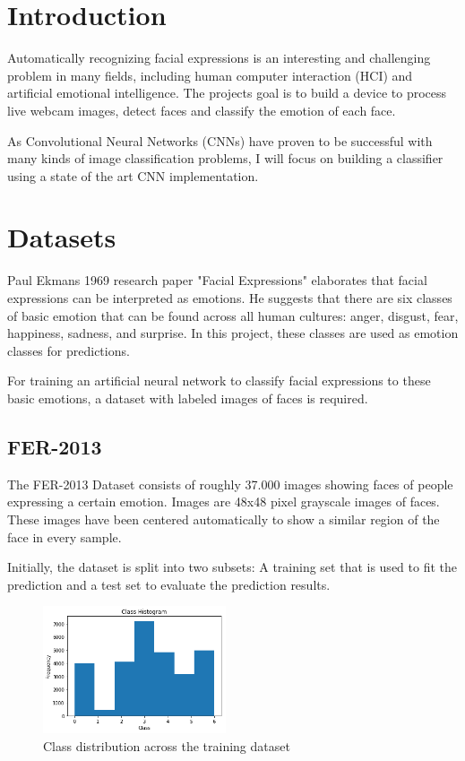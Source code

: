 \documentclass[twoside]{article}
\begin{document}
\begin{multicols}{2} %

\section{Introduction}

Automatically recognizing facial expressions is an interesting and challenging problem in many fields, including human computer interaction (HCI) and artificial emotional intelligence. The projects goal is to build a device to process live webcam images, detect faces and classify the emotion of each face.

As Convolutional Neural Networks (CNNs) have proven to be successful with many kinds of image classification  problems, I will focus on building a classifier using a state of the art CNN implementation.


\section{Datasets}

Paul Ekmans 1969 research paper "Facial Expressions" elaborates that facial expressions can be interpreted as emotions. He suggests that there are six classes of basic emotion that can be found across all human cultures: anger, disgust, fear, happiness, sadness, and surprise. In this project, these classes are used as emotion classes for predictions.

For training an artificial neural network to classify facial expressions to these basic emotions, a dataset with labeled images of faces is required.

\subsection{FER-2013}
The FER-2013 Dataset consists of roughly 37.000 images showing faces of people expressing a certain emotion. Images are 48x48 pixel grayscale images of faces. These images have been centered automatically to show a similar region of the face in every sample. 

Initially, the dataset is split into two subsets: A training set that is used to fit the prediction and a test set to evaluate the prediction results.


\begin{figure}[H]
	\includegraphics[width=0.48\textwidth]{class_dist}
	\caption{Class distribution across the training dataset}
\end{figure}


\end{multicols}
\end{document}

